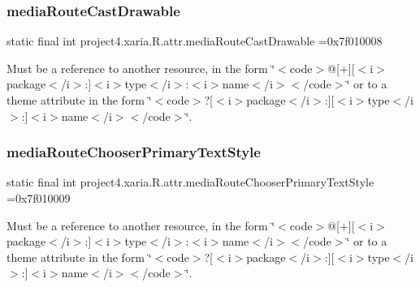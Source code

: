 \subsubsection{\texorpdfstring{media\+Route\+Cast\+Drawable}{mediaRouteCastDrawable}}
{\footnotesize\ttfamily static final int project4.\+xaria.\+R.\+attr.\+media\+Route\+Cast\+Drawable =0x7f010008\hspace{0.3cm}{\ttfamily [static]}}

Must be a reference to another resource, in the form \char`\"{}$<$code$>$@\mbox{[}+\mbox{]}\mbox{[}$<$i$>$package$<$/i$>$\+:\mbox{]}$<$i$>$type$<$/i$>$\+:$<$i$>$name$<$/i$>$$<$/code$>$\char`\"{} or to a theme attribute in the form \char`\"{}$<$code$>$?\mbox{[}$<$i$>$package$<$/i$>$\+:\mbox{]}\mbox{[}$<$i$>$type$<$/i$>$\+:\mbox{]}$<$i$>$name$<$/i$>$$<$/code$>$\char`\"{}. \mbox{\label{classproject4_1_1xaria_1_1R_1_1attr_a36e25c76355742fe46aa116ec008a0df}} 
\subsubsection{\texorpdfstring{media\+Route\+Chooser\+Primary\+Text\+Style}{mediaRouteChooserPrimaryTextStyle}}
{\footnotesize\ttfamily static final int project4.\+xaria.\+R.\+attr.\+media\+Route\+Chooser\+Primary\+Text\+Style =0x7f010009\hspace{0.3cm}{\ttfamily [static]}}

Must be a reference to another resource, in the form \char`\"{}$<$code$>$@\mbox{[}+\mbox{]}\mbox{[}$<$i$>$package$<$/i$>$\+:\mbox{]}$<$i$>$type$<$/i$>$\+:$<$i$>$name$<$/i$>$$<$/code$>$\char`\"{} or to a theme attribute in the form \char`\"{}$<$code$>$?\mbox{[}$<$i$>$package$<$/i$>$\+:\mbox{]}\mbox{[}$<$i$>$type$<$/i$>$\+:\mbox{]}$<$i$>$name$<$/i$>$$<$/code$>$\char`\"{}. \mbox{\label{classproject4_1_1xaria_1_1R_1_1attr_a840a493887bf37bc6a26bd025b0e8cca}} 

